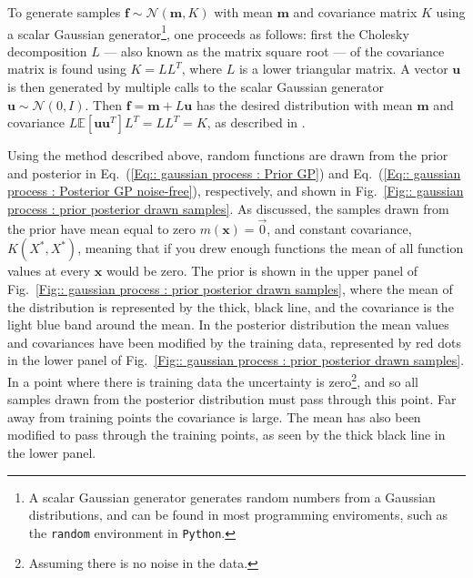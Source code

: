 \documentclass[twoside,english]{uiofysmaster}
\begin{document}
{To generate samples $\textbf{f} \sim \mathcal{N}(\textbf{m}, K)$ with mean $\textbf{m}$ and covariance matrix $K$ using a scalar Gaussian generator\footnote{A scalar Gaussian generator generates random numbers from a Gaussian distributions, and can be found in most programming enviroments, such as the \verb|random| environment in \verb|Python|.}, one proceeds as follows: first the Cholesky decomposition $L$ --- also known as the matrix square root ---  of the covariance matrix is found using $K = LL^T$, where $L$ is a lower triangular matrix. A vector $\textbf{u}$ is then generated by multiple calls to the scalar Gaussian generator $\textbf{u} \sim \mathcal{N}(0, I)$. Then $\textbf{f} = \textbf{m} + L \textbf{u}$ has the desired distribution with mean $\textbf{m}$ and covariance $L \mathbb{E} [\textbf{u} \textbf{u}^T]L^T = LL^T = K$, as described in \cite{rasmussen2006gaussian}.

Using the method described above, random functions are drawn from the prior and posterior in Eq.~(\ref{Eq:: gaussian process : Prior GP}) and Eq.~(\ref{Eq:: gaussian process : Posterior GP noise-free}), respectively, and shown in Fig.~\ref{Fig:: gaussian process : prior posterior drawn samples}. As discussed, the samples drawn from the prior have mean equal to zero $m(\textbf{x})=\vec{0}$, and constant covariance, $K(X^*, X^*)$, meaning that if you drew enough functions the mean of all function values at every $\textbf{x}$ would be zero. The prior is shown in the upper panel of Fig.~\ref{Fig:: gaussian process : prior posterior drawn samples}, where the mean of the distribution is represented by the thick, black line, and the covariance is the light blue band around the mean. In the posterior distribution the mean values and covariances have been modified by the training data, represented by red dots in the lower panel of Fig.~\ref{Fig:: gaussian process : prior posterior drawn samples}. In a point where there is training data the uncertainty is zero\footnote{Assuming there is no noise in the data.}, and so all samples drawn from the posterior distribution must pass through this point. Far away from training points the covariance is large. The mean has also been modified to pass through the training points, as seen by the thick black line in the lower panel.

}
\end{document}
